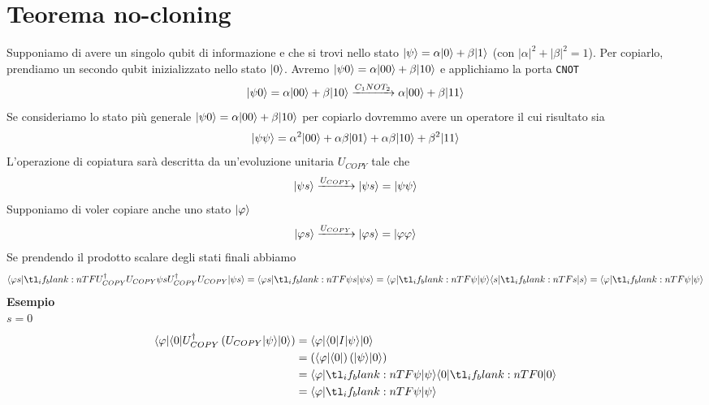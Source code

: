 \documentclass[12pt, a4paper]{report}
\begin{document}
\section{Teorema no-cloning}
Supponiamo di avere un singolo qubit di informazione e che si trovi nello stato $| \psi \rangle=\alpha| 0 \rangle+\beta| 1 \rangle$ (con $|\alpha|^{2}+|\beta|^{2}=1$). Per copiarlo, prendiamo un secondo qubit inizializzato nello stato $| 0 \rangle$. Avremo $| \psi0 \rangle=\alpha| 00 \rangle+\beta| 10 \rangle$ e applichiamo la porta \texttt{CNOT}
\begin{equation*}
    | \psi0 \rangle=\alpha| 00 \rangle+\beta| 10 \rangle\xrightarrow{C_{1}NOT_{2}} \alpha| 00 \rangle+\beta| 11 \rangle
\end{equation*}
Se consideriamo lo stato più generale $| \psi0 \rangle=\alpha| 00 \rangle+\beta| 10 \rangle$ per copiarlo dovremmo avere un operatore il cui risultato sia
\begin{equation*}
    | \psi\psi \rangle = \alpha^{2}| 00 \rangle+\alpha\beta| 01 \rangle+\alpha\beta| 10 \rangle+\beta^{2}| 11 \rangle
\end{equation*}
L'operazione di copiatura sarà descritta da un'evoluzione unitaria $U_{COPY}$ tale che
\begin{equation*}
    | \psi s \rangle\xrightarrow{U_{COPY}}| \psi s \rangle=| \psi\psi \rangle
\end{equation*}
Supponiamo di voler copiare anche uno stato $| \varphi \rangle$ 
\begin{equation*}
    | \varphi s \rangle\xrightarrow{U_{COPY}}| \varphi s \rangle=| \varphi\varphi \rangle
\end{equation*}
Se prendendo il prodotto scalare degli stati finali abbiamo
\begin{equation*}
    \braket{\varphi s}[U^{\dagger}_{COPY}U_{COPY}]{\psi s} = \braket{\varphi s}{\psi s} = \braket{\varphi}{\psi}\braket{s}{s} = \braket{\varphi}{\psi}
\end{equation*}
\textbf{Esempio}\\
$s = 0$
\begin{equation*}
    \begin{split}
      \bra{\varphi}\bra{0}U^{\dagger}_{COPY}\left(U_{COPY}\ket{\psi}\ket{0}\right) &= \bra{\varphi}\bra{0}I\ket{\psi}\ket{0} \\
      &= \left(\bra{\varphi}\bra{0}\right)\left(\ket{\psi}\ket{0}\right) \\
      &= \braket{\varphi}{\psi}\braket{0}{0} \\
      &= \braket{\varphi}{\psi}
    \end{split}
\end{equation*}
\end{document}
